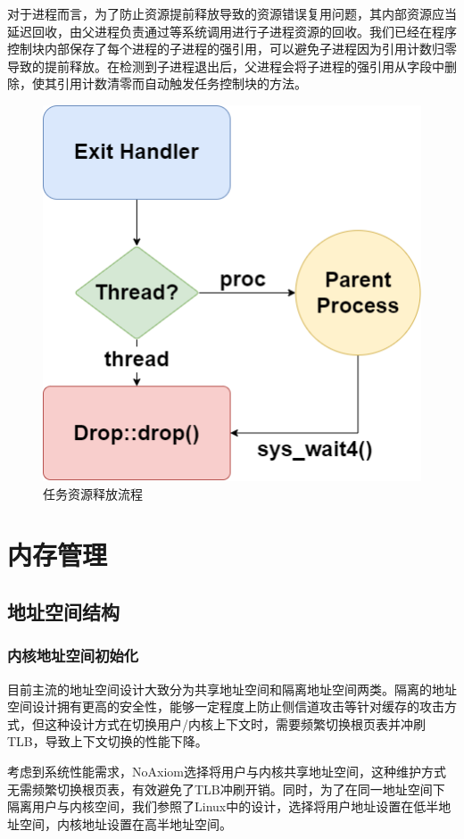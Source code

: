 \documentclass{article}
\begin{document}
对于进程而言，为了防止资源提前释放导致的资源错误复用问题，其内部资源应当延迟回收，由父进程负责通过等系统调用进行子进程资源的回收。我们已经在程序控制块内部保存了每个进程的子进程的强引用，可以避免子进程因为引用计数归零导致的提前释放。在检测到子进程退出后，父进程会将子进程的强引用从字段中删除，使其引用计数清零而自动触发任务控制块的方法。

\begin{figure}[H]
    \centering
    \includegraphics[width=0.5\linewidth]{assets//task/task_exit_handler.drawio.png}
    \caption{任务资源释放流程}
    \label{fig:task_exit_handler}
\end{figure}

\newpage
\section{内存管理}
\subsection{地址空间结构}
\subsubsection{内核地址空间初始化}

目前主流的地址空间设计大致分为共享地址空间和隔离地址空间两类。隔离的地址空间设计拥有更高的安全性，能够一定程度上防止侧信道攻击等针对缓存的攻击方式，但这种设计方式在切换用户/内核上下文时，需要频繁切换根页表并冲刷TLB，导致上下文切换的性能下降。

考虑到系统性能需求，NoAxiom选择将用户与内核共享地址空间，这种维护方式无需频繁切换根页表，有效避免了TLB冲刷开销。同时，为了在同一地址空间下隔离用户与内核空间，我们参照了Linux中的设计，选择将用户地址设置在低半地址空间，内核地址设置在高半地址空间。
\end{document}
